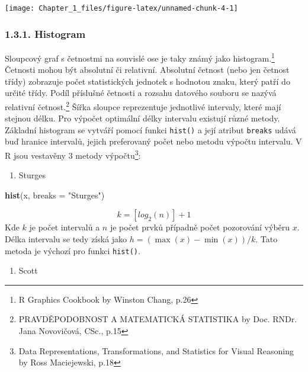 \documentclass[]{article}
\newenvironment{Shaded}{\begin{snugshade}}{\end{snugshade}}
\newcommand{\KeywordTok}[1]{\textcolor[rgb]{0.13,0.29,0.53}{\textbf{#1}}}
\newcommand{\DataTypeTok}[1]{\textcolor[rgb]{0.13,0.29,0.53}{#1}}
\newcommand{\StringTok}[1]{\textcolor[rgb]{0.31,0.60,0.02}{#1}}
\newcommand{\NormalTok}[1]{#1}
\providecommand{\tightlist}{%
  \setlength{\itemsep}{0pt}\setlength{\parskip}{0pt}}
\let\rmarkdownfootnote\footnote%
\def\footnote{\protect\rmarkdownfootnote}
\theoremstyle{definition}
\theoremstyle{definition}
\theoremstyle{remark}
\begin{document}
\begin{center}\texttt{[image: Chapter\_1\_files/figure-latex/unnamed-chunk-4-1]} \end{center}

\subsubsection{1.3.1. Histogram}\label{histogram}

Sloupcový graf s četnostmi na souvislé ose je taky známý jako
histogram.\footnote{R Graphics Cookbook by Winston Chang, p.26} Četnosti
mohou být absolutní či relativní. Absolutní četnost (nebo jen četnost
třídy) zobrazuje počet statistických jednotek s hodnotou znaku, který
patří do určité třídy. Podíl příslušné četnosti a rozsahu datového
souboru se nazývá relativní četnost.\footnote{PRAVDĚPODOBNOST A
  MATEMATICKÁ STATISTIKA by Doc. RNDr. Jana Novovičová, CSc., p.15}
Šířka sloupce reprezentuje jednotlivé intervaly, které mají stejnou
délku. Pro výpočet optimální délky intervalu existují různé metody.
Základní histogram se vytváří pomocí funkci \texttt{hist()} a její
atribut \texttt{breaks} udává buď hranice intervalů, jejich preferovaný
počet nebo metodu výpočtu intervalu. V R jsou vestavěny 3 metody
výpočtu\footnote{Data Representations, Transformations, and Statistics
  for Visual Reasoning by Ross Maciejewski, p.18}:

\begin{enumerate}
\def\labelenumi{\arabic{enumi}.}
\tightlist
\item
  Sturges
\end{enumerate}

\begin{Shaded}
\begin{Highlighting}[]
\KeywordTok{hist}\NormalTok{(x, }\DataTypeTok{breaks =} \StringTok{"Sturges"}\NormalTok{)}
\end{Highlighting}
\end{Shaded}

\[k=[log_2(n)]+1\] Kde \(k\) je počet intervalů a \(n\) je počet prvků
případně počet pozorování výběru \(x\). Délka intervalu se tedy získá
jako \(h=(\max(x)-\min(x))/k\). Tato metoda je výchozí pro funkci
\texttt{hist()}.

\begin{enumerate}
\def\labelenumi{\arabic{enumi}.}
\setcounter{enumi}{1}
\tightlist
\item
  Scott
\end{enumerate}
\end{document}
